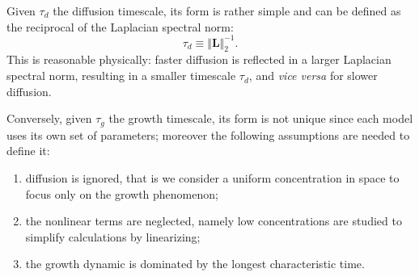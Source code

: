 \documentclass{article}
\begin{document}
                Given $\tau_d$ the diffusion timescale, its form is rather sim\-ple and can be defined as the reciprocal of the Laplacian spectral norm:
                \begin{equation}
                    \tau_d\equiv\Vert\mathbf L\Vert^{-1}_2.
                    \label{eqTauD}
                \end{equation}
                This is reasonable physically: faster diffusion is reflected in a larger Laplacian spectral norm, resulting in a smaller timescale $\tau_d$, and \textit{vice versa} for slower diffusion.

                Conversely, given $\tau_g$ the growth timescale, its form is not unique since each model uses its own set of parameters; moreover the following assumptions are needed to define it:

                \begin{enumerate}[
                    label=G\arabic*, %
                    topsep=7.5pt,	  %
                    itemsep=-1pt,	  %
                    leftmargin=30pt,  %
                    rightmargin=20pt, %
                    ] %
                    \item\label{hypGrowthTimeHypotesisUniform} diffusion is ignored, that is we consider a uniform concentration in space to focus only on the growth phenomenon;
                    \item\label{hypGrowthTimeHypotesisLinear} the nonlinear terms are neglected, namely low concentrations\footnotemark{} are studied to simplify calculations by linearizing;
                    \item\label{hypGrowthTimeHypotesisLongest} the growth dynamic is dominated by the lon\-gest cha\-rac\-te\-ri\-stic time.
                \end{enumerate}

\end{document}
